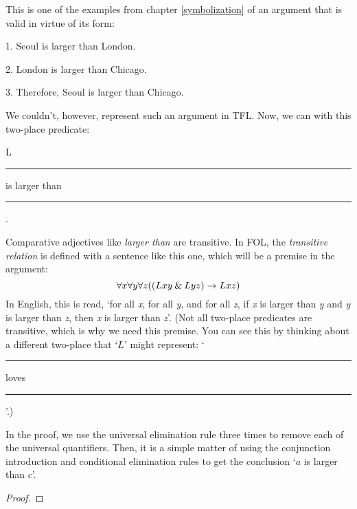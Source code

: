 \noindent\begin{minipage}{0.99\textwidth}
This is one of the examples from chapter \ref{symbolization} of an argument that is valid in virtue of its form:
	\begin{earg}
		\item[1.] Seoul is larger than London.
		\item[2.] London is larger than Chicago.
		\item[3.] Therefore, Seoul is larger than Chicago. 
	\end{earg}
\end{minipage}\bigskip

\noindent We couldn't, however, represent such an argument in TFL. Now, we can with this two-place predicate: 
\begin{ekey}
	\item[L] \rule{1cm}{0.15mm} is larger than \rule{1cm}{0.15mm} .
\end{ekey}
Comparative adjectives like \textit{larger than} are transitive. In FOL, the \textit{transitive relation} is defined with a sentence like this one, which will be a premise in the argument:
$$\forall x \forall y \forall z((Lxy \mathbin{\&} Lyz) \rightarrow Lxz)$$
In English, this is read, `for all \textit{x}, for all \textit{y}, and for all \textit{z}, if \textit{x} is larger than \textit{y} and \textit{y} is larger than \textit{z}, then \textit{x} is larger than \textit{z}'. 
(Not all two-place predicates are transitive, which is why we need this premise. You can see this by thinking about a different two-place that `$L$' might represent: `\rule{1cm}{0.15mm} loves \rule{1cm}{0.15mm}'.)


\smallskip
In the proof, we use the universal elimination rule three times to remove each of the universal quantifiers. Then, it is a simple matter of using the conjunction introduction and conditional elimination rules to get the conclusion `$a$ is larger than $c$'.


\begin{proof}
	 \pr{}
	 \pr{}
	 \pr{}
	 
	 
	 
	 
	 
\end{proof}


